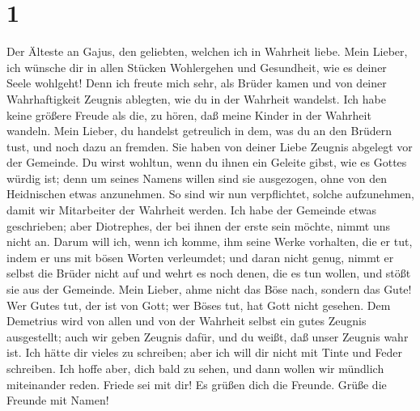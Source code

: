 \hypertarget{section}{%
\section{1}\label{section}}

 Der Älteste an Gajus, den geliebten, welchen ich in
Wahrheit liebe.  Mein Lieber, ich wünsche dir in allen
Stücken Wohlergehen und Gesundheit, wie es deiner Seele wohlgeht!
 Denn ich freute mich sehr, als Brüder kamen und von
deiner Wahrhaftigkeit Zeugnis ablegten, wie du in der Wahrheit wandelst.
 Ich habe keine größere Freude als die, zu hören, daß
meine Kinder in der Wahrheit wandeln.  Mein Lieber, du
handelst getreulich in dem, was du an den Brüdern tust, und noch dazu an
fremden.  Sie haben von deiner Liebe Zeugnis abgelegt vor
der Gemeinde. Du wirst wohltun, wenn du ihnen ein Geleite gibst, wie es
Gottes würdig ist;  denn um seines Namens willen sind sie
ausgezogen, ohne von den Heidnischen etwas anzunehmen.  So
sind wir nun verpflichtet, solche aufzunehmen, damit wir Mitarbeiter der
Wahrheit werden.  Ich habe der Gemeinde etwas geschrieben;
aber Diotrephes, der bei ihnen der erste sein möchte, nimmt uns nicht
an.  Darum will ich, wenn ich komme, ihm seine Werke
vorhalten, die er tut, indem er uns mit bösen Worten verleumdet; und
daran nicht genug, nimmt er selbst die Brüder nicht auf und wehrt es
noch denen, die es tun wollen, und stößt sie aus der Gemeinde.
 Mein Lieber, ahme nicht das Böse nach, sondern das Gute!
Wer Gutes tut, der ist von Gott; wer Böses tut, hat Gott nicht gesehen.
 Dem Demetrius wird von allen und von der Wahrheit selbst
ein gutes Zeugnis ausgestellt; auch wir geben Zeugnis dafür, und du
weißt, daß unser Zeugnis wahr ist.  Ich hätte dir vieles
zu schreiben; aber ich will dir nicht mit Tinte und Feder schreiben.
 Ich hoffe aber, dich bald zu sehen, und dann wollen wir
mündlich miteinander reden. Friede sei mit dir! Es grüßen dich die
Freunde. Grüße die Freunde mit Namen!
